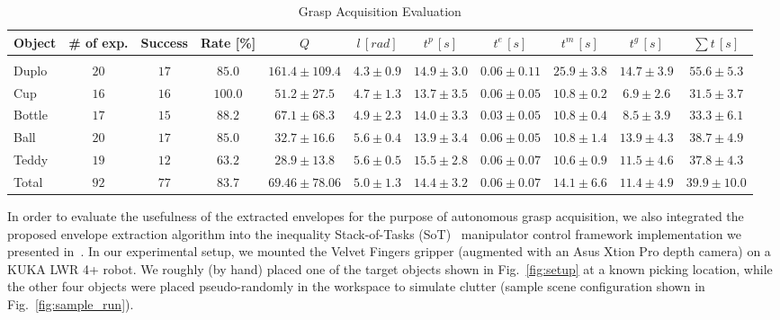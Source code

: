 \begin{table}[t!h]
  \caption{Grasp Acquisition Evaluation}
  \vspace{-0.45cm}
  \begin{center}
    \begin{tabular}{l|c|c|c|c|c|c|c|c|c|c}
      Object  & \# of exp. & Success & Rate [\%] & $Q$ & $l \, [rad]$ & $t^p \, [s]$ & $t^e \, [s]$ & $t^m \, [s]$ & $t^g \, [s]$  & $\sum t \, [s]$     \\
      \hline \\ [-3.2ex]
      Duplo  & $20$ & $17$ & $85.0$ & $161.4\pm109.4$ & $4.3 \pm 0.9$ & $14.9 \pm 3.0$ & $0.06 \pm 0.11$ & $25.9 \pm
      3.8$ & $14.7 \pm 3.9$ & $55.6 \pm 5.3$ \\
      Cup    & $16$ & $16$ & $100.0$ & $51.2\pm27.5$ & $4.7 \pm 1.3$ & $13.7 \pm 3.5$ & $0.06 \pm 0.05$ & $10.8 \pm
      0.2$ & $6.9 \pm 2.6$ & $31.5 \pm 3.7$ \\
      Bottle & $17$ & $15$ & $88.2$ & $67.1\pm68.3$ & $4.9 \pm 2.3$ & $14.0 \pm 3.3$ & $0.03 \pm 0.05$ & $10.8 \pm
      0.4$ & $8.5 \pm 3.9$ & $33.3 \pm 6.1$ \\
      Ball   & $20$ & $17$ & $85.0$ & $32.7\pm16.6$ & $5.6 \pm 0.4$ & $13.9 \pm 3.4$ & $0.06 \pm 0.05$ & $10.8 \pm
      1.4$ & $13.9 \pm 4.3$ & $38.7 \pm 4.9$ \\
      Teddy  & $19$ & $12$ & $63.2$ & $28.9\pm13.8$& $5.6 \pm 0.5$ & $15.5 \pm 2.8$ & $0.06 \pm 0.07$ & $10.6 \pm
      0.9$& $11.5 \pm 4.6$ & $37.8 \pm 4.3$ \\
      \hline
      Total & $92$ & $77$ & $83.7$ & $69.46\pm78.06$ & $5.0 \pm 1.3$ & $14.4 \pm 3.2$ & $0.06 \pm 0.07$ & $14.1 \pm
      6.6$ & $11.4 \pm 4.9$ & $39.9 \pm 10.0$\\
    \end{tabular}
    \label{tab:grasp_acquisition}
  \end{center}
 \vspace{-0.25cm}
\end{table}
%
%
In order to evaluate the usefulness of the extracted envelopes for the purpose of autonomous grasp
acquisition, we also integrated the proposed envelope extraction algorithm into the inequality
Stack-of-Tasks (SoT)~\cite{Kano11} manipulator control framework implementation we presented in~\cite{Krug15}. 
In our experimental setup, we mounted the Velvet Fingers gripper (augmented with an Asus Xtion Pro depth camera) on a KUKA LWR 4+ robot. 
We roughly (by hand) placed one of the target objects shown in Fig.~\ref{fig:setup} at a known picking location, while the other four objects were placed pseudo-randomly in the workspace to simulate clutter (sample scene configuration shown in Fig.~\ref{fig:sample_run}).
